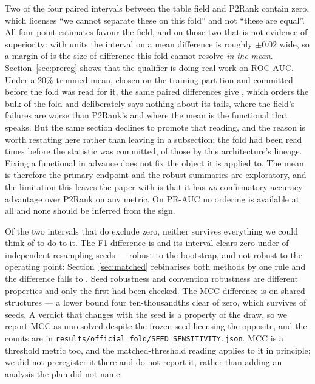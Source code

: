\documentclass[11pt]{article}
\begin{document}
Two of the four paired intervals between the table field and P2Rank contain
zero, which licenses ``we cannot separate these on this fold'' and not ``these
are equal''. All four point estimates favour the field, and on those two that is
not evidence of superiority: with \NUnits{} units the interval on a mean
difference is roughly \(\pm0.02\) wide, so a margin of \TabAucD{} is the size of
difference this fold cannot resolve \emph{in the mean}. Section~\ref{sec:prereg}
shows that the qualifier is doing real work on ROC-AUC. Under a \(20\%\) trimmed
mean, chosen on the training partition and committed before the fold was read
for it, the same paired differences give \PreRegTestDelta{} \PreRegTestCI{},
which orders the bulk of the fold and deliberately says nothing about its tails,
where the field's failures are worse than P2Rank's and where the mean is the
functional that speaks. But the same section declines to promote that reading,
and the reason is worth restating here rather than leaving in a subsection: the
fold had been read \EndReadsBefore{} times before the statistic was committed,
\EndLineageBefore{} of those by this architecture's lineage. Fixing a functional
in advance does not fix the object it is applied to. The mean is therefore the
primary endpoint and the robust summaries are exploratory, and the limitation
this leaves the paper with is that it has \emph{no} confirmatory accuracy
advantage over P2Rank on any metric. On PR-AUC no ordering is available at all
and none should be inferred from the sign.

Of the two intervals that do exclude zero, neither survives everything we could
think of to do to it. The F1 difference is \TabFOneD{} \TabFOneDCI{} and its
interval clears zero under \TabFOneSeedSig{} of \NSeedProbes{} independent
resampling seeds --- robust to the bootstrap, and not robust to the operating
point: Section~\ref{sec:matched} rebinarises both methods by one rule and the
difference falls to \MatchBDelta{} \MatchBCI{}. Seed robustness and convention
robustness are different properties and only the first had been checked. The MCC
difference is \TabMccD{} \TabMccDCI{} on \TabMccNPaired{} shared structures --- a
lower bound four ten-thousandths clear of zero, which survives \TabMccSeedSig{}
of \NSeedProbes{} seeds. A verdict that changes with the seed is a property of
the draw, so we report MCC as unresolved despite the frozen seed licensing the
opposite, and the counts are in
\texttt{results/official\_fold/SEED\_SENSITIVITY.json}. MCC is a threshold metric
too, and the matched-threshold reading applies to it in principle; we did not
preregister it there and do not report it, rather than adding an analysis the
plan did not name.
\end{document}
